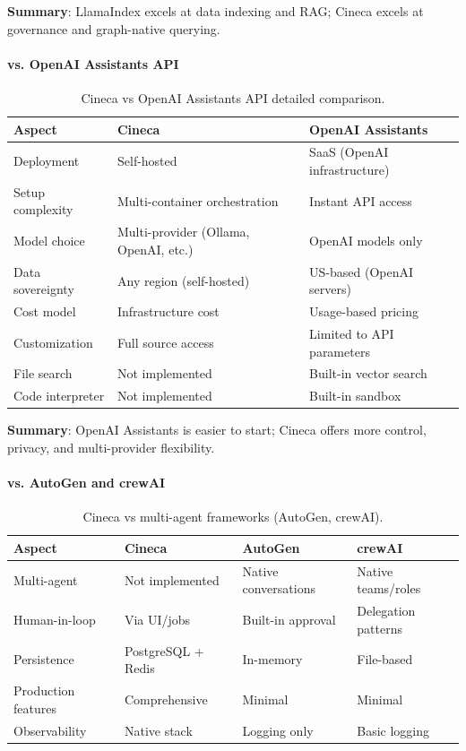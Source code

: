 \textbf{Summary}: LlamaIndex excels at data indexing and RAG; Cineca excels at governance and graph-native querying.

\paragraph{vs. OpenAI Assistants API}

\begin{table}[ht]
\centering
\caption{Cineca vs OpenAI Assistants API detailed comparison.}
\label{tab:vs-openai}
\small
\begin{tabular}{lll}
\hline
\textbf{Aspect} & \textbf{Cineca} & \textbf{OpenAI Assistants} \\
\hline
Deployment & Self-hosted & SaaS (OpenAI infrastructure) \\
Setup complexity & Multi-container orchestration & Instant API access \\
Model choice & Multi-provider (Ollama, OpenAI, etc.) & OpenAI models only \\
Data sovereignty & Any region (self-hosted) & US-based (OpenAI servers) \\
Cost model & Infrastructure cost & Usage-based pricing \\
Customization & Full source access & Limited to API parameters \\
File search & Not implemented & Built-in vector search \\
Code interpreter & Not implemented & Built-in sandbox \\
\hline
\end{tabular}
\end{table}

\textbf{Summary}: OpenAI Assistants is easier to start; Cineca offers more control, privacy, and multi-provider flexibility.

\paragraph{vs. AutoGen and crewAI}

\begin{table}[ht]
\centering
\caption{Cineca vs multi-agent frameworks (AutoGen, crewAI).}
\label{tab:vs-multiagent}
\small
\begin{tabular}{llll}
\hline
\textbf{Aspect} & \textbf{Cineca} & \textbf{AutoGen} & \textbf{crewAI} \\
\hline
Multi-agent & Not implemented & Native conversations & Native teams/roles \\
Human-in-loop & Via UI/jobs & Built-in approval & Delegation patterns \\
Persistence & PostgreSQL + Redis & In-memory & File-based \\
Production features & Comprehensive & Minimal & Minimal \\
Observability & Native stack & Logging only & Basic logging \\
\hline
\end{tabular}
\end{table}

